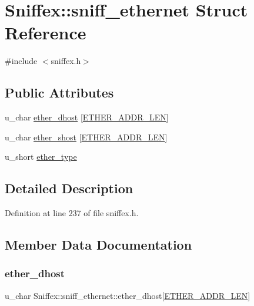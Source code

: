 \hypertarget{struct_sniffex_1_1sniff__ethernet}{}\section{Sniffex\+:\+:sniff\+\_\+ethernet Struct Reference}
\label{struct_sniffex_1_1sniff__ethernet}


{\ttfamily \#include $<$sniffex.\+h$>$}

\subsection*{Public Attributes}
\begin{DoxyCompactItemize}
\item 
u\+\_\+char \hyperlink{struct_sniffex_1_1sniff__ethernet_a68600307767c3cfe20ba593423abec8b}{ether\+\_\+dhost} \mbox{[}\hyperlink{sniffex_8h_abf4fcaacb1ad2010711b7c880ec2ed20}{E\+T\+H\+E\+R\+\_\+\+A\+D\+D\+R\+\_\+\+L\+EN}\mbox{]}
\item 
u\+\_\+char \hyperlink{struct_sniffex_1_1sniff__ethernet_af40407403f51872c064c28298441b2d9}{ether\+\_\+shost} \mbox{[}\hyperlink{sniffex_8h_abf4fcaacb1ad2010711b7c880ec2ed20}{E\+T\+H\+E\+R\+\_\+\+A\+D\+D\+R\+\_\+\+L\+EN}\mbox{]}
\item 
u\+\_\+short \hyperlink{struct_sniffex_1_1sniff__ethernet_a31b8a8e9232feffeeb747f949580753a}{ether\+\_\+type}
\end{DoxyCompactItemize}


\subsection{Detailed Description}


Definition at line 237 of file sniffex.\+h.



\subsection{Member Data Documentation}
\mbox{\label{struct_sniffex_1_1sniff__ethernet_a68600307767c3cfe20ba593423abec8b}} 
\subsubsection{\texorpdfstring{ether\+\_\+dhost}{ether\_dhost}}
{\footnotesize\ttfamily u\+\_\+char Sniffex\+::sniff\+\_\+ethernet\+::ether\+\_\+dhost\mbox{[}\hyperlink{sniffex_8h_abf4fcaacb1ad2010711b7c880ec2ed20}{E\+T\+H\+E\+R\+\_\+\+A\+D\+D\+R\+\_\+\+L\+EN}\mbox{]}}



